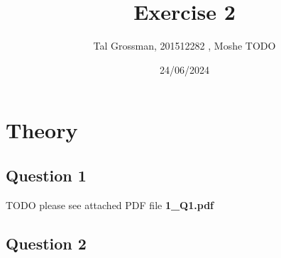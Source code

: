 \documentclass{assignmeownt}
\title{Exercise 2}
\author{Tal Grossman, 201512282 , Moshe TODO}
\date{24/06/2024}
\begin{document}
\maketitle
\thispagestyle{firststyle}
\section{Theory}
\subsection{Question 1}
TODO
\newline
please see attached PDF file \textbf{1\_Q1.pdf}

\subsection{Question 2}
\end{document}
